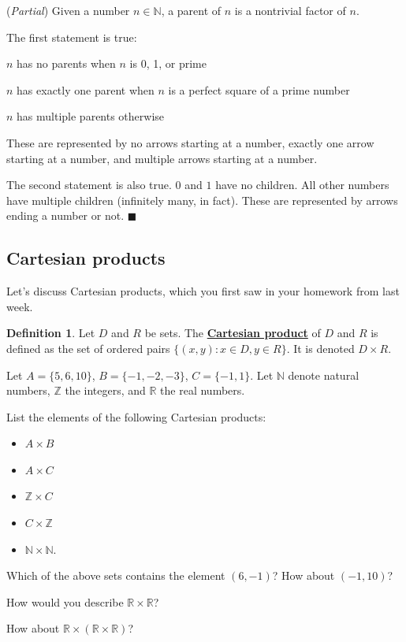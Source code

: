 \documentclass[11pt]{article}
\newenvironment{task}
	{\begin{mdframed}[linecolor=lightgray, linewidth=3pt]\raggedright}
	{\end{mdframed}}
\newcommand{\R}{\mathbb{R}}
\newcommand{\N}{\mathbb{N}}
\newcommand{\Z}{\mathbb{Z}}
\newcommand\st{:}
\renewcommand\emph[1]{\underline{\bf{#1}}} %
\theoremstyle{definition}
\newtheorem{definition}[theorem]{Definition}
\newenvironment{solution}{{\it Solution.} }{\hfill {\color{lightgray}$\blacksquare$}}
\begin{document}
\begin{solution}({\it Partial})
Given a number $n\in \N$, a parent of $n$ is a nontrivial factor of $n$.

The first statement is true: 

\vspace*{-8pt}
\begin{itemize*}
	\item $n$ has no parents when $n$ is 0, 1, or prime \\ 
	\item $n$ has exactly one parent when $n$ is a perfect square of a prime number \\
	\item $n$ has multiple parents otherwise
\end{itemize*}
\vspace*{-8pt}
These are represented by no arrows starting at a number, exactly one arrow starting at a number, and multiple arrows starting at a number.

The second statement is also true. $0$ and $1$ have no children. All other numbers have multiple children (infinitely many, in fact). These are represented by arrows ending a number or not.
\end{solution}


\subsection{Cartesian products}
Let's discuss Cartesian products, which you first saw in your homework from last week.

\begin{definition}
Let $D$ and $R$ be sets. The \emph{Cartesian product} of $D$ and $R$ is defined as the set of ordered pairs $\{ (x,y) \st x\in D, y\in R\}$. It is denoted $D\times R$.
\end{definition}

\begin{task}
Let $A=\{5, 6, 10\}$, $B=\{-1, -2, -3\}$, $C=\{-1,1\}$. Let $\N$ denote natural numbers, $\Z$ the integers,  and $\R$ the real numbers.

List the elements of the following Cartesian products:
	\begin{itemize}
	\item $A\times B$ 
	\item $A\times C$
	\item $\Z \times C$
	\item $C\times \Z$
	\item $\N \times \N$.
	\end{itemize}

Which of the above sets contains the element $(6, -1)$? How about $(-1, 10)$?

How would you describe $\R\times \R$? 

How about $\R\times (\R\times \R)$?
\end{task}
\end{document}
